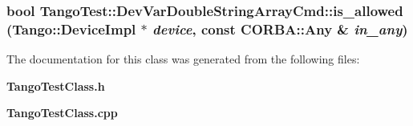 \subsubsection{\setlength{\rightskip}{0pt plus 5cm}bool Tango\-Test::Dev\-Var\-Double\-String\-Array\-Cmd::is\_\-allowed (Tango::Device\-Impl $\ast$ {\em device}, const CORBA::Any \& {\em in\_\-any})\hspace{0.3cm}{\tt  [virtual]}}\label{classTangoTest_1_1DevVarDoubleStringArrayCmd_a3}




The documentation for this class was generated from the following files:\begin{CompactItemize}
\item 
{\bf Tango\-Test\-Class.h}\item 
{\bf Tango\-Test\-Class.cpp}\end{CompactItemize}
